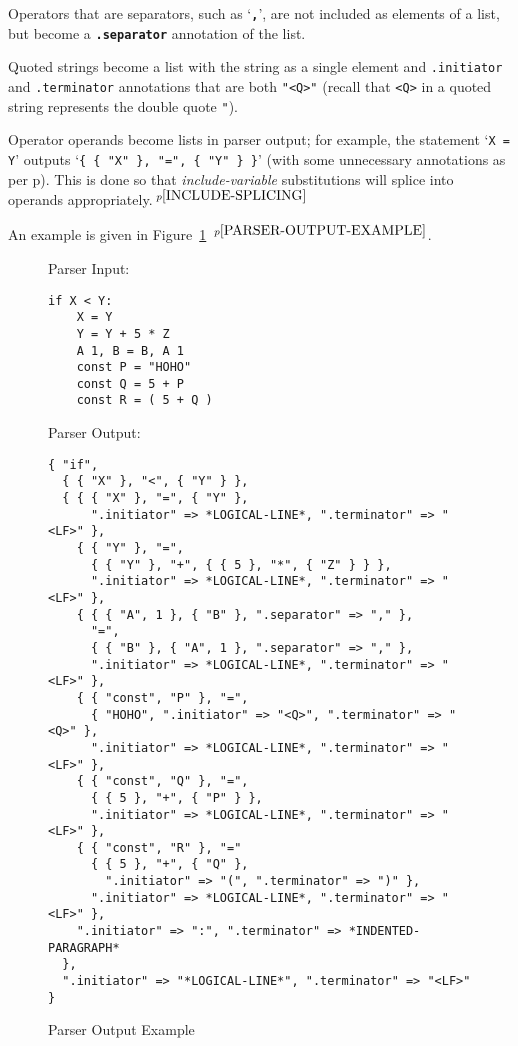 \documentclass[12pt]{article}
\newcommand{\TT}[1]{{\tt \bfseries #1}}
\newcommand{\ttkey}[1]{{\tt \bfseries #1}}
\newcommand{\pagref}[1]{p\pageref{#1}}
\newcommand{\pagnote}[1]{$\,^{p\pageref{#1}}$}
\newlength{\figurewidth}
\newenvironment{boxedfigure}[1][!btp]%
	{\begin{figure*}[#1]
	 \begin{lrbox}{\figurebox}
	 \begin{minipage}{\figurewidth}

	 \vspace*{1ex}}%
	{
	 \vspace*{1ex}

	 \end{minipage}
	 \end{lrbox}

	 \centering
	 \fbox{\hspace*{0.1in}\usebox{\figurebox}\hspace*{0.1in}}
	 \end{figure*}}
\newenvironment{indpar}[1][0.3in]%
	{\begin{list}{}%
		     {\setlength{\itemsep}{0in}%
		      \setlength{\topsep}{0in}%
		      \setlength{\parsep}{1ex}%
		      \setlength{\labelwidth}{#1}%
		      \setlength{\leftmargin}{#1}%
		      \addtolength{\leftmargin}{\labelsep}}%
	 \item}%
	{\end{list}}
\begin{document}
Operators that are separators, such as `\TT{,}', are not included as elements
of a list, but become a \ttkey{.separator} annotation of the list.

Quoted strings become a list with the string as a single element
and {\tt .initiator} and {\tt .terminator} annotations that are
both {\tt "<Q>"} (recall that {\tt <Q>} in a quoted string represents
the double quote {\tt "}).

Operator operands become lists in parser output;
for example, the statement `{\tt X = Y}' outputs
`{\tt \{ \{ "X" \}, "=", \{ "Y" \} \}}' (with some unnecessary annotations as
per \pagref{UNNECESSARY-ANNOTATIONS}).
This is done so that {\em include-variable} substitutions will splice
into operands appropriately.\pagnote{INCLUDE-SPLICING}

An example is given in Figure~\ref{PARSER-OUTPUT-EXAMPLE}%
\pagnote{PARSER-OUTPUT-EXAMPLE}.

\begin{boxedfigure}[!p]
\begin{indpar}[1em]


Parser Input:
\begin{indpar}[1em]\begin{verbatim}
if X < Y:
    X = Y
    Y = Y + 5 * Z
    A 1, B = B, A 1
    const P = "HOHO"
    const Q = 5 + P
    const R = ( 5 + Q )
\end{verbatim}\end{indpar}

\medskip

Parser Output:
\begin{indpar}[1em]\begin{verbatim}
{ "if",
  { { "X" }, "<", { "Y" } },
  { { { "X" }, "=", { "Y" },
      ".initiator" => *LOGICAL-LINE*, ".terminator" => "<LF>" },
    { { "Y" }, "=",
      { { "Y" }, "+", { { 5 }, "*", { "Z" } } },
      ".initiator" => *LOGICAL-LINE*, ".terminator" => "<LF>" },
    { { { "A", 1 }, { "B" }, ".separator" => "," },
      "=",
      { { "B" }, { "A", 1 }, ".separator" => "," },
      ".initiator" => *LOGICAL-LINE*, ".terminator" => "<LF>" },
    { { "const", "P" }, "=",
      { "HOHO", ".initiator" => "<Q>", ".terminator" => "<Q>" },
      ".initiator" => *LOGICAL-LINE*, ".terminator" => "<LF>" },
    { { "const", "Q" }, "=",
      { { 5 }, "+", { "P" } },
      ".initiator" => *LOGICAL-LINE*, ".terminator" => "<LF>" },
    { { "const", "R" }, "="
      { { 5 }, "+", { "Q" },
        ".initiator" => "(", ".terminator" => ")" },
      ".initiator" => *LOGICAL-LINE*, ".terminator" => "<LF>" },
    ".initiator" => ":", ".terminator" => *INDENTED-PARAGRAPH*
  },
  ".initiator" => "*LOGICAL-LINE*", ".terminator" => "<LF>"
}

\end{verbatim}\end{indpar}
\end{indpar}

\caption{Parser Output Example}
\label{PARSER-OUTPUT-EXAMPLE}
\end{boxedfigure}
\end{document}
